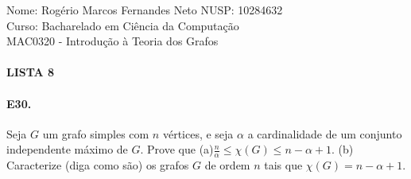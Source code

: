 \documentclass[11pt,a4paper,notitlepage]{exam}
\begin{document}
\begin{center}
    Nome: Rogério Marcos Fernandes Neto\hphantom{xxx} NUSP: 10284632\\
    Curso: Bacharelado em Ciência da Computação\\
    MAC0320 - Introdução à Teoria dos Grafos
    \paragraph{}
    \textbf{LISTA 8}
\end{center}
\paragraph*{E30.}Seja $G$ um grafo simples com $n$ vértices, e seja
$\alpha$ a cardinalidade de um conjunto independente máximo de $G$. Prove
que\bigskip\newline
(a)$\frac{n}{\alpha} \leq \chi(G) \leq n - \alpha + 1$.\newline
(b) Caracterize (diga como são) os grafos $G$ de ordem $n$ tais que
$\chi(G)= n -\alpha + 1$. 
\end{document}
